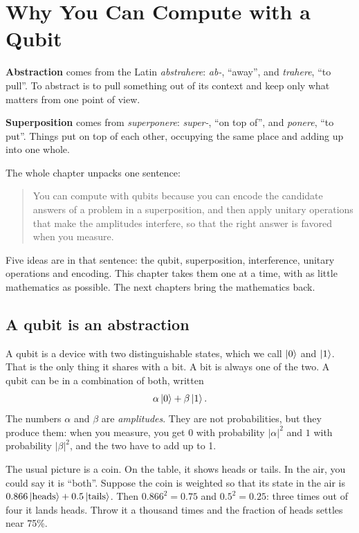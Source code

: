 \chapter{Why You Can Compute with a Qubit}\label{ch:qubit}

\begin{etymology}
\textbf{Abstraction} comes from the Latin \emph{abstrahere}: \emph{ab-},
``away'', and \emph{trahere}, ``to pull''. To abstract is to pull something out
of its context and keep only what matters from one point of view.

\textbf{Superposition} comes from \emph{superponere}: \emph{super-}, ``on top
of'', and \emph{ponere}, ``to put''. Things put on top of each other, occupying
the same place and adding up into one whole.
\end{etymology}

The whole chapter unpacks one sentence:

\begin{quote}
You can compute with qubits because you can encode the candidate answers of a
problem in a superposition, and then apply unitary operations that make the
amplitudes interfere, so that the right answer is favored when you measure.
\end{quote}

Five ideas are in that sentence: the qubit, superposition, interference, unitary
operations and encoding. This chapter takes them one at a time, with as little
mathematics as possible. The next chapters bring the mathematics back.

\section{A qubit is an abstraction}

A qubit is a device with two distinguishable states, which we call $\ket{0}$ and
$\ket{1}$. That is the only thing it shares with a bit. A bit is always one of the
two. A qubit can be in a combination of both, written
\[
  \alpha\ket{0} + \beta\ket{1}.
\]
The numbers $\alpha$ and $\beta$ are \emph{amplitudes}. They are not
probabilities, but they produce them: when you measure, you get $0$ with
probability $|\alpha|^2$ and $1$ with probability $|\beta|^2$, and the two have to
add up to 1.

The usual picture is a coin. On the table, it shows heads or tails. In the air,
you could say it is ``both''. Suppose the coin is weighted so that its state in the
air is $0.866\ket{\text{heads}} + 0.5\ket{\text{tails}}$. Then
$0.866^2 = 0.75$ and $0.5^2 = 0.25$: three times out of four it lands heads. Throw
it a thousand times and the fraction of heads settles near 75\%.


